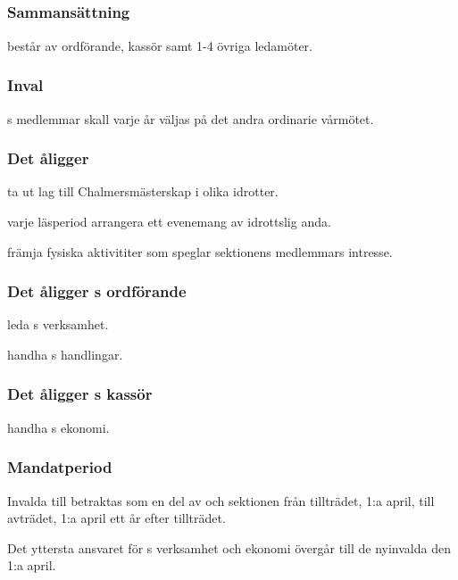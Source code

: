 \subsection{\FRITIDFULL}
\subsubsection{Sammansättning}
\FRITID{} består av ordförande, kassör samt 1-4 övriga ledamöter.

\subsubsection{Inval}
\FRITID{}s medlemmar skall varje år väljas på det andra ordinarie vårmötet.

\subsubsection{Det åligger \FRITID}
\begin{att}
	\item ta ut lag till Chalmersmästerskap i olika idrotter.
	\item varje läsperiod arrangera ett evenemang av idrottslig anda.
	\item främja fysiska aktivititer som speglar sektionens medlemmars intresse.
\end{att}

\subsubsection{Det åligger \FRITID{}s ordförande}
\begin{att}
	\item leda \FRITID{}s verksamhet.
	\item handha \FRITID{}s handlingar.
\end{att}

\subsubsection{Det åligger \FRITID{}s kassör}
\begin{att}
	\item handha \FRITID{}s ekonomi.
\end{att}

\subsubsection{Mandatperiod}
Invalda till \FRITID{} betraktas som en del av \FRITID{} och sektionen från tillträdet, 1:a april, till avträdet, 1:a april ett år efter tillträdet.

Det yttersta ansvaret för \FRITID{}s verksamhet och ekonomi övergår till de nyinvalda den 1:a april.
